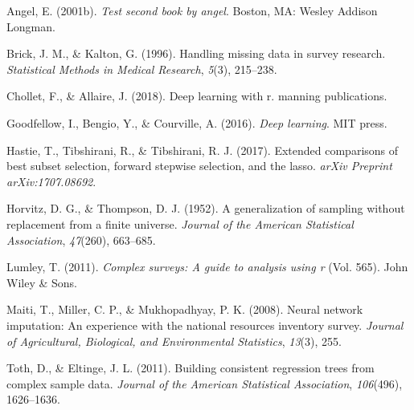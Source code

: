 \documentclass[12pt,twoside]{reedthesis}
\begin{document}
\hypertarget{ref-angel2002a}{}
Angel, E. (2001b). \emph{Test second book by angel}. Boston, MA: Wesley
Addison Longman.

\hypertarget{ref-brick1996handling}{}
Brick, J. M., \& Kalton, G. (1996). Handling missing data in survey
research. \emph{Statistical Methods in Medical Research}, \emph{5}(3),
215--238.

\hypertarget{ref-chollet2018deep}{}
Chollet, F., \& Allaire, J. (2018). Deep learning with r. manning
publications.

\hypertarget{ref-goodfellow2016deep}{}
Goodfellow, I., Bengio, Y., \& Courville, A. (2016). \emph{Deep
learning}. MIT press.

\hypertarget{ref-hastie2017extended}{}
Hastie, T., Tibshirani, R., \& Tibshirani, R. J. (2017). Extended
comparisons of best subset selection, forward stepwise selection, and
the lasso. \emph{arXiv Preprint arXiv:1707.08692}.

\hypertarget{ref-horvitz1952generalization}{}
Horvitz, D. G., \& Thompson, D. J. (1952). A generalization of sampling
without replacement from a finite universe. \emph{Journal of the
American Statistical Association}, \emph{47}(260), 663--685.

\hypertarget{ref-lumley2011complex}{}
Lumley, T. (2011). \emph{Complex surveys: A guide to analysis using r}
(Vol. 565). John Wiley \& Sons.

\hypertarget{ref-maiti2008neural}{}
Maiti, T., Miller, C. P., \& Mukhopadhyay, P. K. (2008). Neural network
imputation: An experience with the national resources inventory survey.
\emph{Journal of Agricultural, Biological, and Environmental
Statistics}, \emph{13}(3), 255.

\hypertarget{ref-toth2011building}{}
Toth, D., \& Eltinge, J. L. (2011). Building consistent regression trees
from complex sample data. \emph{Journal of the American Statistical
Association}, \emph{106}(496), 1626--1636.


\end{document}
